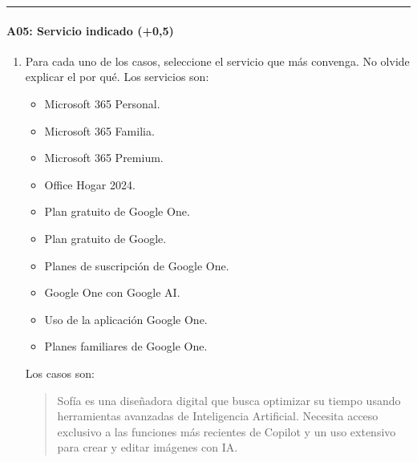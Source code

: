 \documentclass[letterpaper,10pt,spanish]{sphinxmanual}
\begin{document}
\bigskip\hrule\bigskip



\paragraph{A05: Servicio indicado (+0,5)}
\label{\detokenize{cursos/ofimatica10/periodo01/G01:a05-servicio-indicado-0-5}}
\sphinxAtStartPar
{}
\begin{enumerate}
%
\item {} 
\sphinxAtStartPar
Para cada uno de los casos, seleccione el servicio que más convenga. No olvide explicar el por qué. Los servicios son:
\begin{itemize}
\item {} 
\sphinxAtStartPar
Microsoft 365 Personal.

\item {} 
\sphinxAtStartPar
Microsoft 365 Familia.

\item {} 
\sphinxAtStartPar
Microsoft 365 Premium.

\item {} 
\sphinxAtStartPar
Office Hogar 2024.

\item {} 
\sphinxAtStartPar
Plan gratuito de Google One.

\item {} 
\sphinxAtStartPar
Plan gratuito de Google.

\item {} 
\sphinxAtStartPar
Planes de suscripción de Google One.

\item {} 
\sphinxAtStartPar
Google One con Google AI.

\item {} 
\sphinxAtStartPar
Uso de la aplicación Google One.

\item {} 
\sphinxAtStartPar
Planes familiares de Google One.

\end{itemize}

\sphinxAtStartPar
Los casos son:
\begin{quote}

\sphinxAtStartPar
{} Sofía es una diseñadora digital que busca optimizar su tiempo usando herramientas avanzadas de Inteligencia Artificial. Necesita acceso exclusivo a las funciones más recientes de Copilot y un uso extensivo para crear y editar imágenes con IA.
\end{quote}
\begin{quote}


\end{quote}
\end{enumerate}
\end{document}
